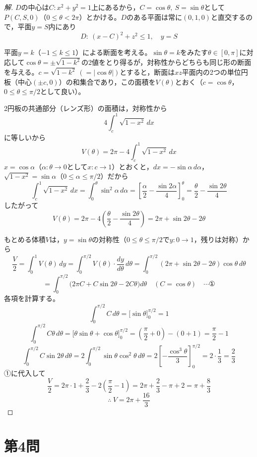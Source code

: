 \documentclass[../main.tex]{subfiles}
\begin{document}
\begin{proof}[解]
  $D$の中心は$C:x^2+y^2=1$上にあるから，$C=\cos\theta,\ S=\sin\theta$として$P(C,S,0)$（$0\le\theta<2\pi$）とかける。$D$のある平面は常に$(0,1,0)$と直交するので，平面$y=S$内にあり
  \[
    D:\ (x-C)^2+z^2\le1,\quad y=S
  \]

  平面$y=k$（$-1\le k\le1$）による断面を考える。$\sin\theta=k$をみたす$\theta\in[0,\pi]$に対応して$\cos\theta=\pm\sqrt{1-k^2}$の2値をとり得るが，対称性からどちらも同じ形の断面を与える。$c=\sqrt{1-k^2}\ (=|\cos\theta|)$とすると，断面は$xz$平面内の2つの単位円板（中心$(\pm c,0)$）の和集合であり，この面積を$V(\theta)$とおく（$c=\cos\theta$，$0\le\theta\le\pi/2$として良い）。

  2円板の共通部分（レンズ形）の面積は，対称性から
  \[
    4\int_c^1\sqrt{1-x^2}\,dx
  \]
  に等しいから
  \[
    V(\theta)=2\pi-4\int_c^1\sqrt{1-x^2}\,dx
  \]
  $x=\cos\alpha$（$\alpha:\theta\to0$として$x:c\to1$）とおくと，$dx=-\sin\alpha\,d\alpha$，$\sqrt{1-x^2}=\sin\alpha$（$0\le\alpha\le\pi/2$）だから
  \[
    \int_c^1\sqrt{1-x^2}\,dx=\int_0^\theta\sin^2\alpha\,d\alpha=\left[\frac\alpha2-\frac{\sin2\alpha}4\right]_0^\theta=\frac\theta2-\frac{\sin2\theta}4
  \]
  したがって
  \[
    V(\theta)=2\pi-4\left(\frac\theta2-\frac{\sin2\theta}4\right)=2\pi+\sin2\theta-2\theta
  \]

  もとめる体積$V$は，$y=\sin\theta$の対称性（$0\le\theta\le\pi/2$で$y:0\to1$，残りは対称）から
  \[
    \frac V2=\int_0^1V(\theta)\,dy=\int_0^{\pi/2}V(\theta)\cdot\frac{dy}{d\theta}\,d\theta=\int_0^{\pi/2}(2\pi+\sin2\theta-2\theta)\cos\theta\,d\theta
  \]
  \[
    =\int_0^{\pi/2}\bigl(2\pi C+C\sin2\theta-2C\theta\bigr)d\theta \quad(C=\cos\theta) \quad\cdots\text{①}
  \]
  各項を計算する。
  \[
    \int_0^{\pi/2}C\,d\theta=\bigl[\sin\theta\bigr]_0^{\pi/2}=1
  \]
  \[
    \int_0^{\pi/2}C\theta\,d\theta=\bigl[\theta\sin\theta+\cos\theta\bigr]_0^{\pi/2}=\left(\frac\pi2+0\right)-(0+1)=\frac\pi2-1
  \]
  \[
    \int_0^{\pi/2}C\sin2\theta\,d\theta=2\int_0^{\pi/2}\sin\theta\cos^2\theta\,d\theta=2\left[-\frac{\cos^3\theta}3\right]_0^{\pi/2}=2\cdot\frac13=\frac23
  \]
  ①に代入して
  \[
    \frac V2=2\pi\cdot1+\frac23-2\left(\frac\pi2-1\right)=2\pi+\frac23-\pi+2=\pi+\frac83
  \]
  \[
    \therefore\ V=2\pi+\frac{16}3
  \]
\end{proof}

\newpage

\section*{第4問}
\end{document}
